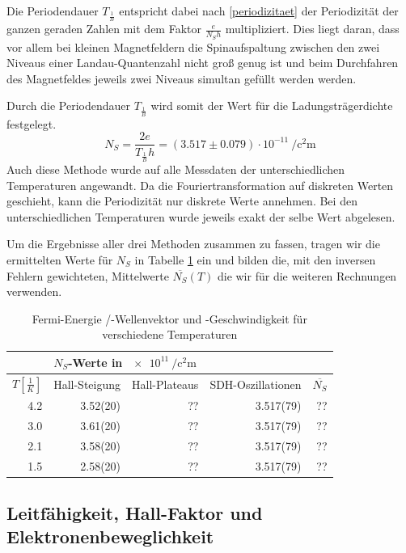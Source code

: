 \documentclass[paper=a4,fontsize=10pt,DIV=18,twocolumn,parskip=half]{scrartcl}
\numberwithin{equation}{section}    %
\begin{document}
Die Periodendauer $T_{\frac{1}{B}}$ entspricht dabei nach \eqref{periodizitaet} der Periodizität der ganzen geraden Zahlen mit dem Faktor $\frac{e}{N_S h}$ multipliziert. Dies liegt daran, dass vor allem bei kleinen Magnetfeldern die Spinaufspaltung zwischen den zwei Niveaus einer Landau-Quantenzahl nicht groß genug ist und beim Durchfahren des Magnetfeldes jeweils zwei Niveaus simultan gefüllt werden werden.

Durch die Periodendauer $T_{\frac{1}{B}}$ wird somit der Wert für die Ladungsträgerdichte festgelegt.
\begin{equation}
N_S=\frac{2 e}{T_{\frac{1}{B}} h}=(3.517 \pm 0.079) \cdot 10^{-11}\SI{}{\per\square\centi\meter}
\label{ns_periode}
\end{equation}
Auch diese Methode wurde auf alle Messdaten der unterschiedlichen Temperaturen angewandt. Da die Fouriertransformation auf diskreten Werten geschieht, kann die Periodizität nur diskrete Werte annehmen. Bei den unterschiedlichen Temperaturen wurde jeweils exakt der selbe Wert abgelesen.

Um die Ergebnisse aller drei Methoden zusammen zu fassen, tragen wir die ermittelten Werte für $N_S$ in Tabelle \ref{nswerte} ein und bilden die, mit den inversen Fehlern gewichteten, Mittelwerte $\overline{N_S}(T)$ die wir für die weiteren Rechnungen verwenden.

\begin{table}[htp]
	\begin{center}
		\begin{tabular}{rrrrr}
			& \multicolumn{2}{l}{$N_S$-Werte in $\SI{e11}{\per\square\centi\meter}$}&&\\
			\hline
			$T[\frac{1}{K}]$ & Hall-Steigung & Hall-Plateaus & SDH-Oszillationen & $\overline{N_S}$\\
			\hline
			4.2 &3.52(20)&??&3.517(79) &??\\
			3.0 &3.61(20)&??&3.517(79) &??\\
			2.1 &3.58(20)&??&3.517(79) &??\\
			1.5 &2.58(20)&??&3.517(79) &??\\
			\hline
		\end{tabular}
		\caption{Fermi-Energie /-Wellenvektor und -Geschwindigkeit für verschiedene Temperaturen}
		\label{nswerte}
	\end{center}
\end{table}

\subsection{Leitfähigkeit, Hall-Faktor und Elektronenbeweglichkeit}
\label{a3}
\end{document}
